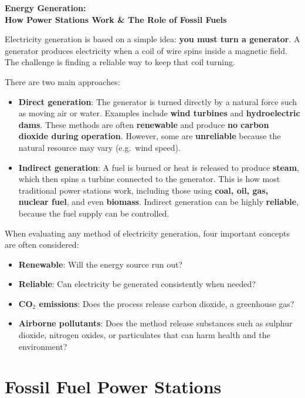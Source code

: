 \documentclass[12pt]{article}
\begin{document}
\begin{center}
{\Large \textbf{Energy Generation:}}\\[4pt]
{\large \textbf{How Power Stations Work \& The Role of Fossil Fuels}}
\end{center}

Electricity generation is based on a simple idea: \textbf{you must turn a generator}. A generator produces electricity when a coil of wire spins inside a magnetic field. The challenge is finding a reliable way to keep that coil turning.

There are two main approaches:

\begin{itemize}
    \item \textbf{Direct generation}: The generator is turned directly by a natural force such as moving air or water. Examples include \textbf{wind turbines} and \textbf{hydroelectric dams}. These methods are often \textbf{renewable} and produce \textbf{no carbon dioxide during operation}. However, some are \textbf{unreliable} because the natural resource may vary (e.g.\ wind speed).
    
    \item \textbf{Indirect generation}: A fuel is burned or heat is released to produce \textbf{steam}, which then spins a turbine connected to the generator. This is how most traditional power stations work, including those using \textbf{coal, oil, gas, nuclear fuel}, and even \textbf{biomass}. Indirect generation can be highly \textbf{reliable}, because the fuel supply can be controlled.
\end{itemize}

When evaluating any method of electricity generation, four important concepts are often considered:

\begin{itemize}
    \item \textbf{Renewable}: Will the energy source run out?
    \item \textbf{Reliable}: Can electricity be generated consistently when needed?
    \item \textbf{CO$_2$ emissions}: Does the process release carbon dioxide, a greenhouse gas?
    \item \textbf{Airborne pollutants}: Does the method release substances such as sulphur dioxide, nitrogen oxides, or particulates that can harm health and the environment?
\end{itemize}

\section*{Fossil Fuel Power Stations}
\end{document}
